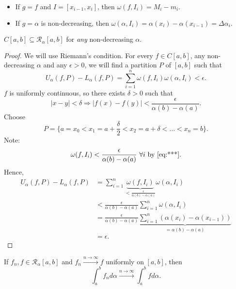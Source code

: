 \documentclass[letterpaper, reqno,11pt]{article}
\begin{document}
\begin{remark}
  \normalfont
  \begin{itemize}
  \item If $g = f$ and $I = [x_{i - 1}, x_i]$, then $\omega(f, I_i) = M_i - m_i$.
  \item If $g = \alpha$ is non-decreasing, then $\omega(\alpha, I_i) = \alpha(x_i) - \alpha(x_{i - 1}) = \Delta \alpha_i$.
  \end{itemize}
\end{remark}

\begin{cor}
  \normalfont $C[a, b] \subseteq \mathcal R_\alpha[a, b]$ for \emph{any} non-decreasing $\alpha$.
\end{cor}

\begin{proof}
  We will use Riemann's condition. For every $f \in C[a, b]$, any non-decreasing $\alpha$ and any $\epsilon > 0$, we will find a partition $P$ of $[a, b]$ such that
  $$ U_\alpha(f, P) - L_\alpha(f, P) = \sum_{i = 1}^n \omega(f, I_i) \omega(\alpha, I_i) < \epsilon. $$
  $f$ is uniformly continuous, so there exists $\delta > 0$ such that
  \begin{equation} \label{eq:***} \tag{***}
    |x - y| < \delta \Rightarrow |f(x) - f(y)| < \frac{\epsilon}{\alpha(b) - \alpha(a)}.
  \end{equation}
  Choose
  $$ P = \{ a = x_0 < x_1 = a + \frac{\delta}{2} < x_2 = a + \delta < \ldots < x_n = b \}. $$
  Note:
  $$ \omega(f, I_i) < \frac{\epsilon}{\alpha(b) - \alpha(a)} ~ \forall i \text{ by \eqref{eq:***}}. $$
  Hence,
  \begin{align*}
    U_\alpha(f, P) - L_\alpha(f, P) &= \sum_{i = 1}^n \underbrace{\omega(f, I_i)}_{< \frac{\epsilon}{\alpha(b) - \alpha(a)}} \omega(\alpha, I_i) \\
    &< \frac{\epsilon}{\alpha(b) - \alpha(a)} \sum_{i = 1}^n \omega(\alpha, I_i) \\
    &= \frac{\epsilon}{\alpha(b) - \alpha(a)} \underbrace{\sum_{i = 1}^n (\alpha(x_i) - \alpha(x_{i - 1}))}_{= \alpha(b) - \alpha(a)} \\
    &= \epsilon.
  \end{align*}
\end{proof}

\begin{thm}
  \normalfont If $f_n, f \in \mathcal R_\alpha[a, b]$ and $f_n \xrightarrow{n \to \infty} f$ uniformly on $[a, b]$, then
  $$ \int_a^b f_n d\alpha \xrightarrow{n \to \infty} \int_a^b fd\alpha. $$
\end{thm}
\end{document}
